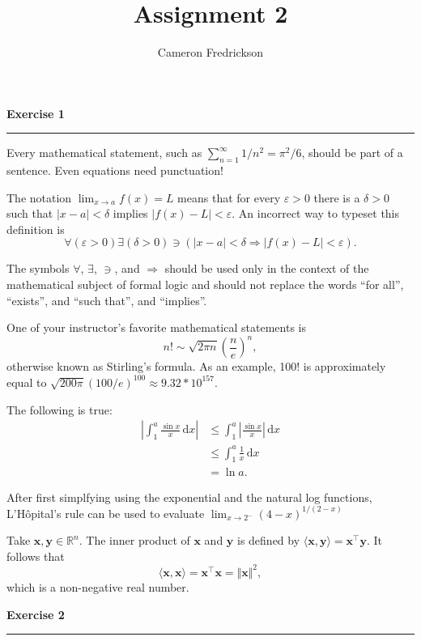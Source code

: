 \documentclass{article}
\title{Assignment 2}
\author{Cameron Fredrickson}
\date{}
\newcommand{\ud}{\, \mathrm{d}}
\begin{document}
\maketitle

\noindent \textbf{Exercise 1}

\noindent \rule{\textwidth}{.1mm}

Every mathematical statement, such as $ \sum_{n=1}^\infty 1/n^2 = \pi^2/6$, should be part of a sentence. Even equations need punctuation!

The notation $ \lim_{x \to a} f(x) = L$ means that for every $ \varepsilon > 0$ there is a $ \delta > 0$ such that $|x-a| < \delta$ implies $|f(x)-L| < \varepsilon$. An incorrect way to typeset this definition is \begin{equation*}
\forall \left( \varepsilon > 0 \right) \exists \left( \delta > 0 \right) \ni \left( |x-a| < \delta \Longrightarrow |f(x)-L| < \varepsilon \right).
\end{equation*}

The symbols $\forall$, $\exists$, $\ni$, and $\Longrightarrow$ should be used only in the context of the mathematical subject of formal logic and should not replace the words ``for all'', ``exists'', and ``such that'', and ``implies''.

One of your instructor's favorite mathematical statements is \begin{equation*}
n! \sim \sqrt{2 \pi n} \left( \frac{n}{e} \right)^{n},
\end{equation*} otherwise known as Stirling's formula. As an example,   100! is approximately equal to $ \sqrt{200 \pi} \left( 100/e \right)^{100} \approx 9.32 * 10^{157}.$

The following is true: \begin{align*}
\left| \int_1^a \frac{\sin x}{x} \ud x\right| &\leq \int_1^a \left|\frac{\sin x}{x}\right| \ud x \\
&\leq \int_1^a \frac{1}{x} \ud x \\
&= \ln a.
\end{align*}

After first simplfying using the exponential and the natural log functions, L'H\^opital's rule can be used to evaluate $ \lim_{x \to 2^-} (4-x)^{1/(2-x)}$

Take $\mathbf{x, y} \in \mathbb{R}^n$. The inner product of $\mathbf{x}$ and $\mathbf{y}$ is defined by $\langle \mathbf{x},\mathbf{y} \rangle = \mathbf{x}^\intercal \mathbf{y}$. It follows that \begin{equation*}
\langle \mathbf{x},\mathbf{x} \rangle = \mathbf{x}^\intercal \mathbf{x} = \Vert \mathbf{x} \Vert^2,
\end{equation*} which is a non-negative real number.

\newpage
\noindent \textbf{Exercise 2}


\noindent \rule{\textwidth}{.1mm}
\end{document}
